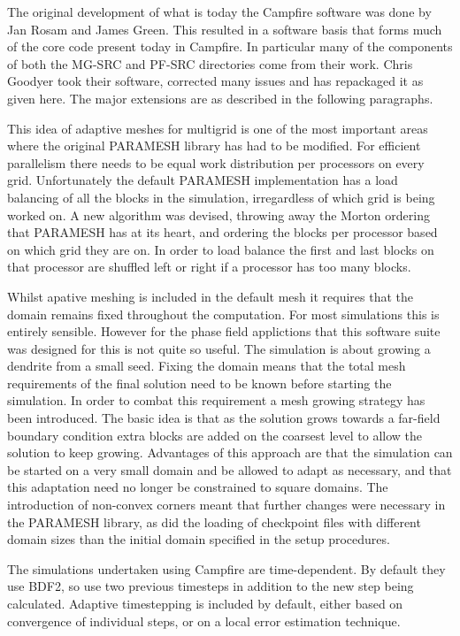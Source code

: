 \documentclass[paper=a4, fontsize=11pt,twoside,bibtotoc]{scrartcl}		%
\begin{document}
The original development of what is today the Campfire software was done by Jan Rosam and James Green.  This resulted in a software basis that forms much of the 
core code present today in Campfire.  In particular many of the components of both the MG-SRC and PF-SRC directories come from their work.  Chris Goodyer took 
their software, corrected many issues and has repackaged it as given here.  The major extensions are as described in the following paragraphs.

This idea of adaptive meshes for multigrid is one of the most important areas where the original PARAMESH library has had to be modified.  
For efficient parallelism there needs to be equal work distribution per processors on every grid.  Unfortunately the default PARAMESH implementation has a load 
balancing of all the blocks in the simulation, irregardless of which grid is being worked on.  A new algorithm was devised, throwing away the Morton ordering that 
PARAMESH has at its heart, and ordering the blocks per processor based on which grid they are on.  In order to load balance the first and last blocks on that 
processor are shuffled left or right if a processor has too many blocks.

Whilst apative meshing is included in the default mesh it requires that the domain remains fixed throughout the computation.  For most simulations this is entirely 
sensible.  However for the phase field applictions that this software suite was designed for this is not quite so useful.  The simulation is about growing a 
dendrite from a small seed.  Fixing the domain means that the total mesh requirements of the final solution need to be known before starting the simulation.  In 
order to combat this requirement a mesh growing strategy has been introduced.  The basic idea is that as the solution grows towards a far-field boundary condition 
extra blocks are added on the coarsest level to allow the solution to keep growing.  Advantages of this approach are that the simulation can be started on a very 
small domain and be allowed to adapt as necessary, and that this adaptation need no longer be constrained to square domains.  The introduction of non-convex 
corners meant that further changes were necessary in the PARAMESH library, as did the loading of checkpoint files with different domain sizes than the initial 
domain specified in the setup procedures.

The simulations undertaken using Campfire are time-dependent.  By default they use BDF2, so use two previous timesteps in addition to the new step being 
calculated.  Adaptive timestepping is included by default, either based on convergence of individual steps, or on a local error estimation technique.
\end{document}
